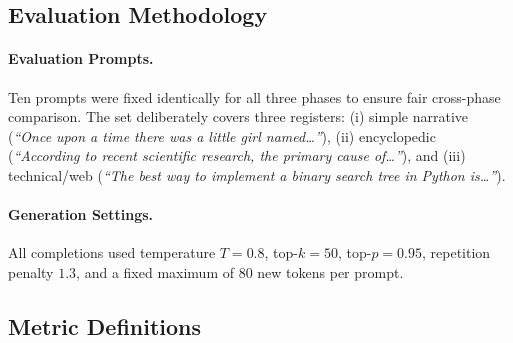 \documentclass[12pt]{article}
\begin{document}
\subsection{Evaluation Methodology}

\paragraph{Evaluation Prompts.}
Ten prompts were fixed identically for all three phases to ensure fair cross-phase comparison. The set deliberately covers three registers: (i) simple narrative (\textit{``Once upon a time there was a little girl named\ldots''}), (ii) encyclopedic (\textit{``According to recent scientific research, the primary cause of\ldots''}), and (iii) technical/web (\textit{``The best way to implement a binary search tree in Python is\ldots''}).

\paragraph{Generation Settings.}
All completions used temperature $T=0.8$, top-$k=50$, top-$p=0.95$, repetition penalty $1.3$, and a fixed maximum of 80 new tokens per prompt.

\subsection{Metric Definitions}
\end{document}
